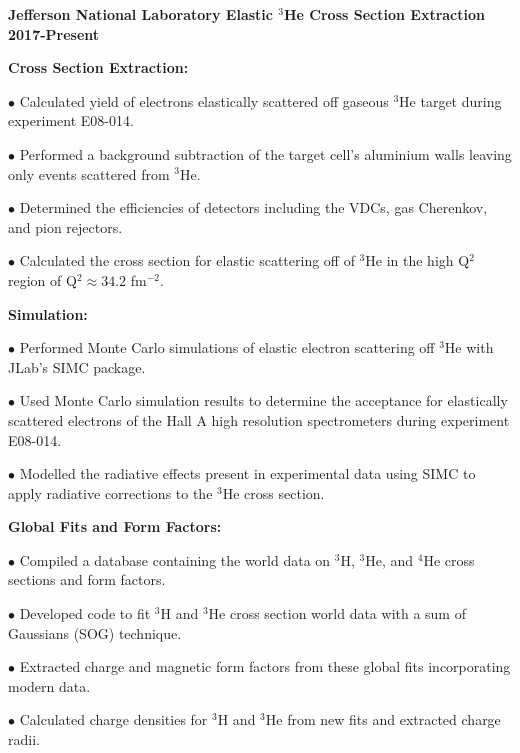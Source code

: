 \documentclass[letterpaper,10pt]{article}
\renewenvironment{itemize}{
  \begin{list}{}{
    \setlength{\leftmargin}{1.5em}
  }
}{
  \end{list}
}
\begin{document}
{\begin{itemize}
\item {\large {\bf Jefferson National Laboratory Elastic $^{3}$He Cross Section Extraction 2017-Present} }
	\begin{itemize}\itemsep5pt \parskip0pt 
		\item \textbf{Cross Section Extraction:}
			\begin{itemize}\itemsep5pt
				\item $\bullet$ Calculated yield of electrons elastically scattered off gaseous $^{3}$He target during experiment E08-014.   
				\item $\bullet$ Performed a background subtraction of the target cell's aluminium walls leaving only events scattered from $^{3}$He.
				\item $\bullet$ Determined the efficiencies of detectors including the VDCs, gas Cherenkov, and pion rejectors.
				\item $\bullet$ Calculated the cross section for elastic scattering off of $^{3}$He in the high Q$^2$ region of Q$^2 \approx 34.2$ fm$^{-2}$.
			\end{itemize}
		\item \textbf{Simulation:}
			\begin{itemize}\itemsep5pt
				\item $\bullet$ Performed Monte Carlo simulations of elastic electron scattering off $^{3}$He with JLab's SIMC package. 
				\item $\bullet$ Used Monte Carlo simulation results to determine the acceptance for elastically scattered electrons of the Hall A high resolution spectrometers during experiment E08-014. 
				\item $\bullet$ Modelled the radiative effects present in experimental data using SIMC to apply radiative corrections to the $^{3}$He cross section.
			\end{itemize}
		\item \textbf{Global Fits and Form Factors:}
			\begin{itemize}\itemsep5pt
				\item $\bullet$ Compiled a database containing the world data on $^{3}$H, $^{3}$He, and $^{4}$He cross sections and form factors.
				\item $\bullet$ Developed code to fit $^{3}$H and $^{3}$He cross section world data with a sum of Gaussians (SOG) technique. 
				\item $\bullet$ Extracted charge and magnetic form factors from these global fits incorporating modern data. 
				\item $\bullet$ Calculated charge densities for $^{3}$H and $^{3}$He from new fits and extracted charge radii. 
			\end{itemize}
			

\end{itemize}
\end{itemize}}
\end{document}
